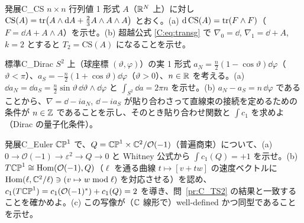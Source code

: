 \begin{probl}{発展}{C_CS}
$n\times n$ 行列値 1 形式 $A$（$\mathbb R^N$ 上）に対し $\mathrm{CS}(A)=\operatorname{tr}\bigl(A\wedge\mathrm{d} A+\frac23A\wedge A\wedge A\bigr)$ とおく。(a) $\mathrm{d}\,\mathrm{CS}(A)=\operatorname{tr}(F\wedge F)$（$F=\dd A+A\wedge A$）を示せ。(b) 超越公式 \eqref{C:eq:transg} で $\nabla_0=\dd$, $\nabla_1=\dd+A$, $k=2$ とすると $T_2=\mathrm{CS}(A)$ になることを示せ。
\end{probl}
\begin{probl}{標準}{C_Dirac}
$S^2$ 上（球座標 $(\vartheta,\varphi)$）の実 1 形式 $a_N=\frac n2(1-\cos\vartheta)\dd\varphi$（$\vartheta<\pi$）、$a_S=-\frac n2(1+\cos\vartheta)\dd\varphi$（$\vartheta>0$）、$n\in\mathbb R$ を考える。(a) $\dd a_N=\dd a_S=\frac n2\sin\vartheta\,\dd\vartheta\wedge\dd\varphi$ と $\int_{S^2}\dd a=2\pi n$ を示せ。(b) $a_N-a_S=n\,\dd\varphi$ であることから、$\nabla=\dd-ia_N$, $\dd-ia_S$ が貼り合わさって直線束の接続を定めるための条件が $n\in\mathbb Z$ であることを示し、そのとき貼り合わせ関数と $\int c_1$ を求めよ（Dirac の量子化条件）。
\end{probl}
\begin{probl}{発展}{C_Euler}
$\mathbb{CP}^1$ で、$Q=\mathbb{CP}^1\times\mathbb C^2/\mathcal O(-1)$（普遍商束）について、(a) $0\to\mathcal O(-1)\to\varepsilon^2\to Q\to0$ と Whitney 公式から $\int c_1(Q)=+1$ を示せ。(b) $T\mathbb{CP}^1\cong\mathrm{Hom}(\mathcal O(-1),Q)$（$\ell$ を通る曲線 $t\mapsto[v+tw]$ の速度ベクトルに $\mathrm{Hom}(\ell,\mathbb C^2/\ell)\ni(v\mapsto w\bmod\ell)$ を対応させる）を認め、$c_1(T\mathbb{CP}^1)=c_1(\mathcal O(-1)^*)+c_1(Q)=2$ を導き、問~\ref{pr:C_TS2} の結果と一致することを確かめよ。(c) この写像が（$\mathbb C$ 線形で）well-defined かつ同型であることを示せ。
\end{probl}
